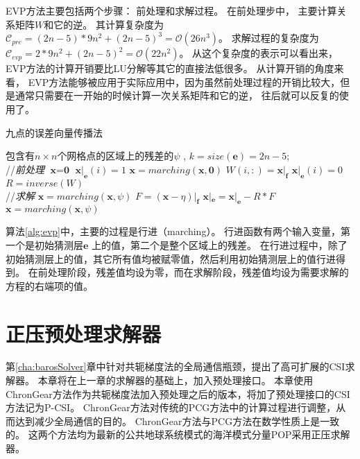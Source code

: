  
EVP方法主要包括两个步骤： 前处理和求解过程。 
在前处理步中， 主要计算关系矩阵$W$和它的逆。 其计算复杂度为$\mathcal{C}_{pre}=
(2n-5)* 9n^2 + (2n-5)^3 = \mathcal {O} (26n^3)$。 
求解过程的复杂度为$\mathcal{C}_{evp}= 2* 9n^2 + (2n-5)^2 = \mathcal{O} (22n^2)$。 
从这个复杂度的表示可以看出来，EVP方法的计算开销要比LU分解等其它的直接法低很多。 
从计算开销的角度来看， EVP方法能够被应用于实际应用中，因为虽然前处理过程的开销比较大，但是通常只需要在一开始的时候计算一次关系矩阵和它的逆， 往后就可以反复的使用了。

\begin{algorithm}[t!]
\caption{九点的误差向量传播法}
\label{alg:evp}
\begin{algorithmic}[1]
\REQUIRE 包含有$n\times n$个网格点的区域上的残差的$\psi$ , $k = size(\textbf{e})=2n-5$; \\
//\qquad \textit{前处理}
\STATE  $\textbf{x} = \textbf{0}$
\STATE $\textbf{x}|_\textbf{e}(i) = 1$
\STATE $\textbf{x} = marching(\textbf{x},\textbf{0})$
\STATE $W(i,:) = \textbf{x}|_\textbf{f}$
\STATE $\textbf{x}|_\textbf{e}(i) = 0$
\ENDFOR
\STATE $R = inverse(W)$ \\
//\qquad \textit{求解 }
\STATE $\textbf{x}= marching(\textbf{x},\psi)$
\STATE $F = (\textbf{x} - \eta)|_\textbf{f}$ 
\STATE $\textbf{x}|_\textbf{e} =\textbf{x}|_\textbf{e} - R*F$ 
\STATE $\textbf{x} = marching(\textbf{x},\psi)$
\end{algorithmic}
\end{algorithm}

算法\ref{alg:evp}中，主要的过程是行进（marching）。
行进函数有两个输入变量，第一个是初始猜测层$\textbf{e}$ 上的值，第二个是整个区域上的残差。 
在行进过程中，除了初始猜测层上的值，其它所有值均被赋零值，然后利用初始猜测层上的值行进得到。
在前处理阶段，残差值均设为零，而在求解阶段，残差值均设为需要求解的方程的右端项的值。

\section{正压预处理求解器}
第\ref{cha:barosSolver}章中针对共轭梯度法的全局通信瓶颈，提出了高可扩展的CSI求解器。 
本章将在上一章的求解器的基础上，加入预处理接口。
本章使用ChronGear方法作为共轭梯度法加入预处理之后的版本，将加了预处理接口的CSI方法记为P-CSI。
ChronGear方法对传统的PCG方法中的计算过程进行调整，从而达到减少全局通信的目的。
ChronGear方法与PCG方法在数学性质上是一致的。
这两个方法均为最新的公共地球系统模式的海洋模式分量POP采用正压求解器\cite{yong2015}。 

